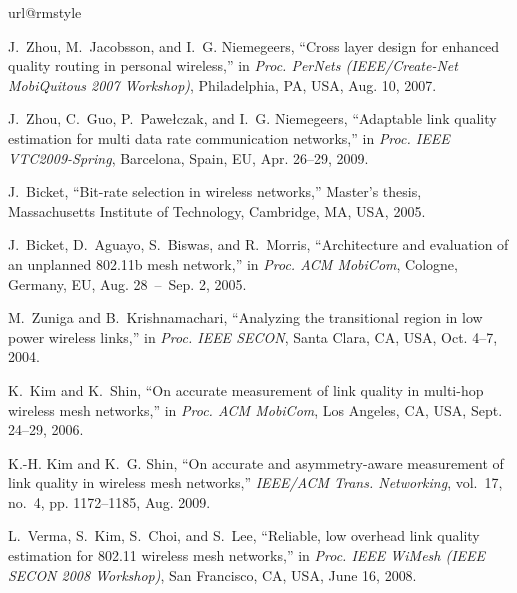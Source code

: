 \documentclass[11pt,draftclsnofoot,journal,onecolumn]{IEEEtran}
\begin{document}
\begin{thebibliography}{10}
\providecommand{\url}[1]{#1}
\csname url@rmstyle\endcsname
\providecommand{\newblock}{\relax}
\providecommand{\bibinfo}[2]{#2}
\providecommand\BIBentrySTDinterwordspacing{\spaceskip=0pt\relax}
\providecommand\BIBentryALTinterwordstretchfactor{4}
\providecommand\BIBentryALTinterwordspacing{\spaceskip=\fontdimen2\font plus
\BIBentryALTinterwordstretchfactor\fontdimen3\font minus
  \fontdimen4\font\relax}
\providecommand\BIBforeignlanguage[2]{{\expandafter\ifx\csname l@#1\endcsname\relax
\else
\language=\csname l@#1\endcsname
\fi
#2}}

J.~{Zhou}, M.~{Jacobsson}, and I.~G. {Niemegeers}, ``Cross layer design for
  enhanced quality routing in personal wireless,'' in \emph{Proc. PerNets
  (IEEE/Create-Net MobiQuitous 2007 Workshop)}, Philadelphia, PA, USA, Aug. 10,
  2007.

J.~{Zhou}, C.~{Guo}, P.~{Pawe{\l}czak}, and I.~G. {Niemegeers}, ``Adaptable
  link quality estimation for multi data rate communication networks,'' in
  \emph{Proc. IEEE VTC2009-Spring}, Barcelona, Spain, EU, Apr. 26--29, 2009.

J.~Bicket, ``Bit-rate selection in wireless networks,'' Master's thesis,
  Massachusetts Institute of Technology, Cambridge, MA, USA, 2005.

J.~{Bicket}, D.~{Aguayo}, S.~{Biswas}, and R.~{Morris}, ``Architecture and
  evaluation of an unplanned 802.11b mesh network,'' in \emph{Proc. ACM
  MobiCom}, Cologne, Germany, EU, Aug. 28~--~Sep. 2, 2005.

M.~{Zuniga} and B.~{Krishnamachari}, ``Analyzing the transitional region in low
  power wireless links,'' in \emph{Proc. IEEE SECON}, Santa Clara, CA, USA,
  Oct. 4--7, 2004.

K.~{Kim} and K.~{Shin}, ``On accurate measurement of link quality in multi-hop
  wireless mesh networks,'' in \emph{Proc. ACM MobiCom}, Los Angeles, CA, USA,
  Sept. 24--29, 2006.

K.-H. {Kim} and K.~G. {Shin}, ``On accurate and asymmetry-aware measurement of
  link quality in wireless mesh networks,'' \emph{{IEEE/ACM} Trans.
  Networking}, vol.~17, no.~4, pp. 1172--1185, Aug. 2009.

L.~{Verma}, S.~{Kim}, S.~{Choi}, and S.~{Lee}, ``Reliable, low overhead link
  quality estimation for 802.11 wireless mesh networks,'' in \emph{Proc. IEEE
  WiMesh (IEEE SECON 2008 Workshop)}, San Francisco, CA, USA, June 16, 2008.


\end{thebibliography}
\end{document}
